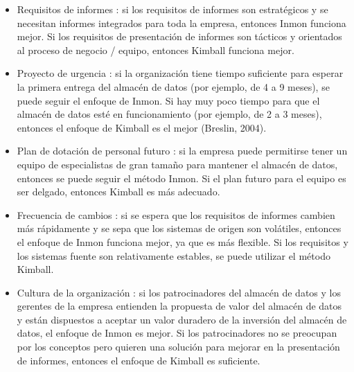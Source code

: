 \documentclass[twoside,twocolumn]{article}
\begin{document}
\begin{itemize}
 \item Requisitos de informes : si los requisitos de informes son estratégicos y se necesitan informes integrados para toda la empresa, entonces Inmon funciona mejor. Si los requisitos de presentación de informes son tácticos y orientados al proceso de negocio / equipo, entonces Kimball funciona mejor.\\


 \item Proyecto de urgencia : si la organización tiene tiempo suficiente para esperar la primera entrega del almacén de datos (por ejemplo, de 4 a 9 meses), se puede seguir el enfoque de Inmon. Si hay muy poco tiempo para que el almacén de datos esté en funcionamiento (por ejemplo, de 2 a 3 meses), entonces el enfoque de Kimball es el mejor (Breslin, 2004).\\
 \item Plan de dotación de personal futuro : si la empresa puede permitirse tener un equipo de especialistas de gran tamaño para mantener el almacén de datos, entonces se puede seguir el método Inmon. Si el plan futuro para el equipo es ser delgado, entonces Kimball es más adecuado.
 \item Frecuencia de cambios : si se espera que los requisitos de informes cambien más rápidamente y se sepa que los sistemas de origen son volátiles, entonces el enfoque de Inmon funciona mejor, ya que es más flexible. Si los requisitos y los sistemas fuente son relativamente estables, se puede utilizar el método Kimball.\\
 \item Cultura de la organización : si los patrocinadores del almacén de datos y los gerentes de la empresa entienden la propuesta de valor del almacén de datos y están dispuestos a aceptar un valor duradero de la inversión del almacén de datos, el enfoque de Inmon es mejor. Si los patrocinadores no se preocupan por los conceptos pero quieren una solución para mejorar en la presentación de informes, entonces el enfoque de Kimball es suficiente.\\

\end{itemize} 



\end{document}
